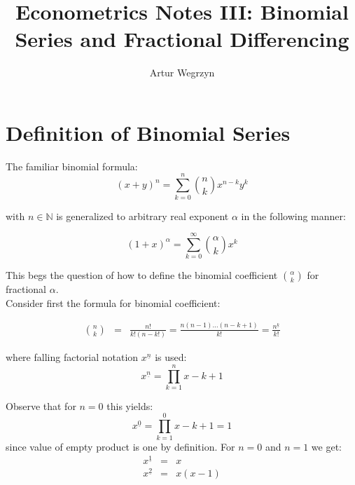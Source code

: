 \documentclass[12pt]{article}
\begin{document}
\title{Econometrics Notes III: Binomial Series and Fractional Differencing}
\author{Artur Wegrzyn}
\maketitle



\tableofcontents

\section{Definition of Binomial Series}
The familiar binomial formula:
\begin{equation*}
(x+y)^n = \sum_{k=0}^{n} \binom{n}{k} x^{n-k} y^{k}
\end{equation*}

with $n \in \mathbb{N}$ is generalized to arbitrary 
real exponent $\alpha$ in the following manner:

\begin{equation}
(1 + x)^{\alpha} = \sum_{k=0}^{\infty} \binom{\alpha}{k} x^k
\end{equation}

This begs the question of how to define the binomial coefficient 
$\binom{\alpha}{k}$ for fractional $\alpha$. \\
\indent Consider first the formula for binomial coefficient:

\begin{eqnarray*}
\binom{n}{k} &=& \frac{n!}{k!(n-k!)} = \frac{n(n-1)\dots (n-k+1)}{k!} = \frac{n^{\underline{k}}}{k!}
\end{eqnarray*}

where falling factorial notation $x^{\underline{n}}$ is used:
\begin{equation*}
x^{\underline{n}} = \prod_{k=1}^{n} x - k + 1
\end{equation*}

Observe that for $n=0$ this yields:
\begin{equation*}
x^{\underline{0}} = \prod_{k=1}^{0}x - k + 1 = 1
\end{equation*}
since value of empty product is one by definition. For $n=0$ and $n=1$ we get:
\begin{eqnarray*}
x^{\underline{1}} &=& x \\
x^{\underline{2}} &=& x (x-1)
\end{eqnarray*}
 
\end{document}
